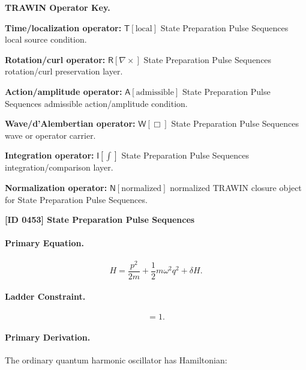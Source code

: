 \par\vspace{0.45\baselineskip}
\noindent\begin{minipage}[t]{\linewidth}
\begingroup
\small
\raggedright
\textbf{TRAWIN Operator Key.}\par
\noindent\textbf{Time/localization operator:} $\mathsf{T}\!\left[\mathrm{local}\right]$ State Preparation Pulse Sequences local source condition.\par
\noindent\textbf{Rotation/curl operator:} $\mathsf{R}\!\left[\nabla\times\right]$ State Preparation Pulse Sequences rotation/curl preservation layer.\par
\noindent\textbf{Action/amplitude operator:} $\mathsf{A}\!\left[\mathrm{admissible}\right]$ State Preparation Pulse Sequences admissible action/amplitude condition.\par
\noindent\textbf{Wave/d'Alembertian operator:} $\mathsf{W}\!\left[\Box\right]$ State Preparation Pulse Sequences wave or operator carrier.\par
\noindent\textbf{Integration operator:} $\mathsf{I}\!\left[\int\right]$ State Preparation Pulse Sequences integration/comparison layer.\par
\noindent\textbf{Normalization operator:} $\mathsf{N}\!\left[\mathrm{normalized}\right]$ normalized TRAWIN closure object for State Preparation Pulse Sequences.\par
\endgroup
\end{minipage}

\clearpage
\noindent\textbf{[ID 0453] State Preparation Pulse Sequences}\par
\vspace{0.35em}
\paragraph{Primary Equation.}
\begin{equation}
H
=
\frac{p^2}{2m}
+
\frac{1}{2}m\omega^2 q^2
+
\delta H .
\end{equation}

\paragraph{Ladder Constraint.}
\begin{equation}
[a,a^\dagger]=1 .
\end{equation}

\paragraph{Primary Derivation.}
The ordinary quantum harmonic oscillator has Hamiltonian:

